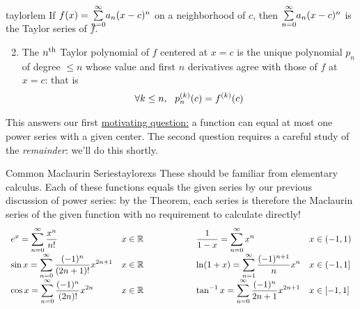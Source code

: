 \begin{thm}{}{taylorlem}
\exstart If $f(x)=\smash[b]{\sum\limits_{n=0}^\infty} a_n(x-c)^n$ on a neighborhood of $c$, then $\smash[b]{\sum\limits_{n=0}^\infty} a_n(x-c)^n$ is the Taylor series of $f$.
\begin{enumerate}\setcounter{enumi}{1}
	\item The $n\textsuperscript{th}$ Taylor polynomial of $f$ centered at $x=c$ is the unique polynomial $p_n$ of degree $\le n$ whose value and first $n$ derivatives agree with those of $f$ at $x=c$: that is
	\[\forall k\le n,\ \ \smash[t]{p_n^{(k)}(c)=f^{(k)}(c)}\]
\end{enumerate}
\end{thm}

This answers our first \hyperref[taylormotiv]{motivating question:} a function can equal at most one power series with a given center. The second question requires a careful study of the \emph{remainder}: we'll do this shortly.

\begin{examples}{Common Maclaurin Series}{taylorexs}
These should be familiar from elementary calculus. Each of these functions equals the given series by our previous discussion of power series: by the Theorem, each series is therefore the Maclaurin series of the given function with no requirement to calculate directly!
\[\def\arraystretch{2}
\begin{array}{ll@{\qquad\qquad\qquad}ll}
\displaystyle e^x=\sum_{n=0}^\infty\frac{x^n}{n!} & x\in\R
&\displaystyle\frac 1{1-x}=\sum_{n=0}^\infty x^n & x\in(-1,1)\\
\displaystyle\sin x=\sum_{n=0}^\infty\frac{(-1)^n}{(2n+1)!}x^{2n+1} & x\in\R
&\displaystyle\ln(1+x)=\sum_{n=1}^\infty \frac{(-1)^{n+1}}nx^n & x\in (-1,1]\\
\displaystyle\cos x=\sum_{n=0}^\infty\frac{(-1)^n}{(2n)!}x^{2n} & x\in\R
&\displaystyle\tan^{-1}x=\sum_{n=0}^\infty \frac{(-1)^n}{2n+1}x^{2n+1} & x\in[-1,1]
\end{array}
\]
\end{examples}

\goodbreak

% 

